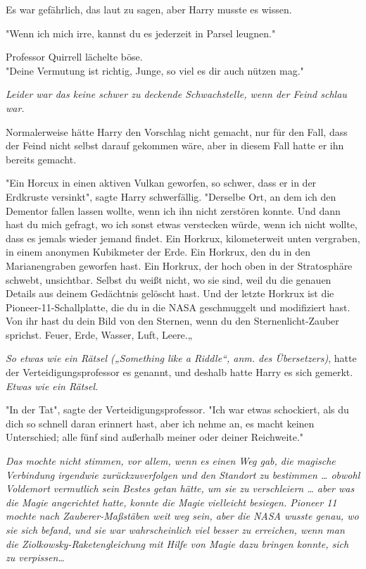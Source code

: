{Es war gefährlich, das laut zu sagen, aber Harry musste es wissen.

"Wenn ich mich irre, kannst du es jederzeit in Parsel leugnen."

Professor Quirrell lächelte böse.\\ "Deine Vermutung ist richtig, Junge, so viel es dir auch nützen mag."

\emph{Leider war das keine schwer zu deckende Schwachstelle, wenn der Feind schlau war.}

Normalerweise hätte Harry den Vorschlag nicht gemacht, nur für den Fall, dass der Feind nicht selbst darauf gekommen wäre, aber in diesem Fall hatte er ihn bereits gemacht.

"Ein Horcux in einen aktiven Vulkan geworfen, so schwer, dass er in der Erdkruste versinkt", sagte Harry schwerfällig. "Derselbe Ort, an dem ich den Dementor fallen lassen wollte, wenn ich ihn nicht zerstören konnte. Und dann hast du mich gefragt, wo ich sonst etwas verstecken würde, wenn ich nicht wollte, dass es jemals wieder jemand findet. Ein Horkrux, kilometerweit unten vergraben, in einem anonymen Kubikmeter der Erde. Ein Horkrux, den du in den Marianengraben geworfen hast. Ein Horkrux, der hoch oben in der Stratosphäre schwebt, unsichtbar. Selbst du weißt nicht, wo sie sind, weil du die genauen Details aus deinem Gedächtnis gelöscht hast. Und der letzte Horkrux ist die Pioneer-11-Schallplatte, die du in die NASA geschmuggelt und modifiziert hast. Von ihr hast du dein Bild von den Sternen, wenn du den Sternenlicht-Zauber sprichst. Feuer, Erde, Wasser, Luft, Leere.„

\emph{So etwas wie ein Rätsel („Something like a Riddle“, anm. des Übersetzers)}, hatte der Verteidigungsprofessor es genannt, und deshalb hatte Harry es sich gemerkt.\\ \emph{Etwas wie ein Rätsel.}

"In der Tat", sagte der Verteidigungsprofessor. "Ich war etwas schockiert, als du dich so schnell daran erinnert hast, aber ich nehme an, es macht keinen Unterschied; alle fünf sind außerhalb meiner oder deiner Reichweite."

\emph{Das mochte nicht stimmen, vor allem, wenn es einen Weg gab, die magische Verbindung irgendwie zurückzuverfolgen und den Standort zu bestimmen … obwohl Voldemort vermutlich sein Bestes getan hätte, um sie zu verschleiern … aber was die Magie angerichtet hatte, konnte die Magie vielleicht besiegen. Pioneer 11 mochte nach Zauberer-Maßstäben weit weg sein, aber die NASA wusste genau, wo sie sich befand, und sie war wahrscheinlich viel besser zu erreichen, wenn man die Ziolkowsky-Raketengleichung mit Hilfe von Magie dazu bringen konnte, sich zu verpissen…}

}
